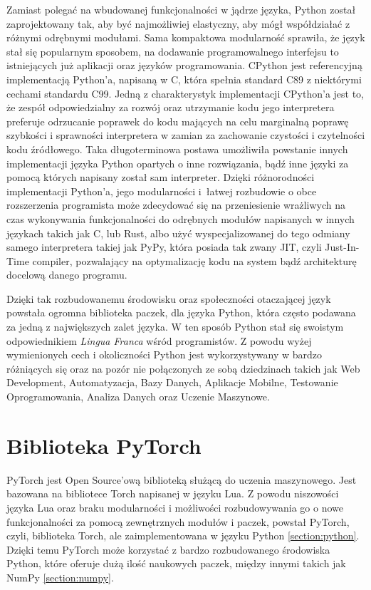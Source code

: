 Zamiast polegać na wbudowanej funkcjonalności w jądrze języka, Python został zaprojektowany tak, aby być najmożliwiej elastyczny, aby mógł współdziałać z różnymi odrębnymi modułami. Sama kompaktowa modularność sprawiła, że język stał się popularnym sposobem, na dodawanie programowalnego interfejsu to istniejących już aplikacji oraz języków programowania.
CPython jest referencyjną implementacją Python'a, napisaną w C, która spełnia standard C89 z niektórymi cechami standardu C99. Jedną z charakterystyk implementacji CPython'a jest to, że zespół odpowiedzialny za rozwój oraz utrzymanie kodu jego interpretera preferuje odrzucanie poprawek do kodu mających na celu marginalną poprawę szybkości i sprawności interpretera w zamian za zachowanie czystości i czytelności kodu źródłowego. Taka długoterminowa postawa umożliwiła powstanie innych implementacji języka Python opartych o inne rozwiązania, bądź inne języki za pomocą których napisany został sam interpreter. Dzięki różnorodności implementacji Python'a, jego modularności i~łatwej rozbudowie o obce rozszerzenia programista może zdecydować się na przeniesienie wrażliwych na czas wykonywania funkcjonalności do odrębnych modułów napisanych w innych językach takich jak C, lub Rust, albo użyć wyspecjalizowanej do tego odmiany samego interpretera takiej jak PyPy, która posiada tak zwany JIT, czyli Just-In-Time compiler, pozwalający na optymalizację kodu na system bądź architekturę docelową danego programu.

Dzięki tak rozbudowanemu środowisku oraz społeczności otaczającej język powstała ogromna biblioteka paczek, dla języka Python, która często podawana za jedną z największych zalet języka. W ten sposób Python stał się swoistym odpowiednikiem \textit{Lingua Franca} wśród programistów. Z powodu wyżej wymienionych cech i okoliczności Python jest wykorzystywany w bardzo różniących się oraz na pozór nie połączonych ze sobą dziedzinach takich jak Web Development, Automatyzacja, Bazy Danych, Aplikacje Mobilne, Testowanie Oprogramowania, Analiza Danych oraz Uczenie Maszynowe.



\section{Biblioteka PyTorch}
\label{section:pytorch}
PyTorch \cite{PyTorchWebSite} \cite{DeepLearningWithPyTorch} \cite{ProgrammingPyTorchForDeepLearning} \cite{PyTorchPocketReference} jest Open Source'ową biblioteką służącą do uczenia maszynowego. Jest bazowana na bibliotece Torch napisanej w języku Lua. Z powodu niszowości języka Lua oraz braku modularności i możliwości rozbudowywania go o nowe funkcjonalności za pomocą zewnętrznych modułów i paczek, powstał PyTorch, czyli, biblioteka Torch, ale zaimplementowana w języku Python \ref{section:python}. Dzięki temu PyTorch może korzystać z bardzo rozbudowanego środowiska Python, które oferuje dużą ilość naukowych paczek, między innymi takich jak NumPy \ref{section:numpy}.


